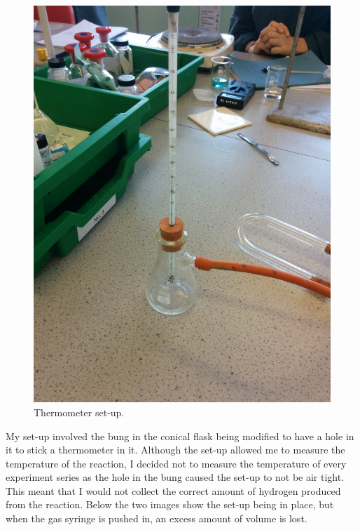 \begin{figure}[H]
    \includegraphics[width=\textwidth]{./preliminarywork/images/ThermometerSetUp.jpg}
    \caption{Thermometer set-up.} \label{fig:Thermometer Set-Up}
\end{figure}

My set-up involved the bung in the conical flask being modified to have a hole in it to stick a thermometer in it. Although the set-up allowed me to measure the temperature of the reaction, I decided not to measure the temperature of every experiment series as the hole in the bung caused the set-up to not be air tight. This meant that I would not collect the correct amount of hydrogen produced from the reaction. Below the two images show the set-up being in place, but when the gas syringe is pushed in, an excess amount of volume is lost.

